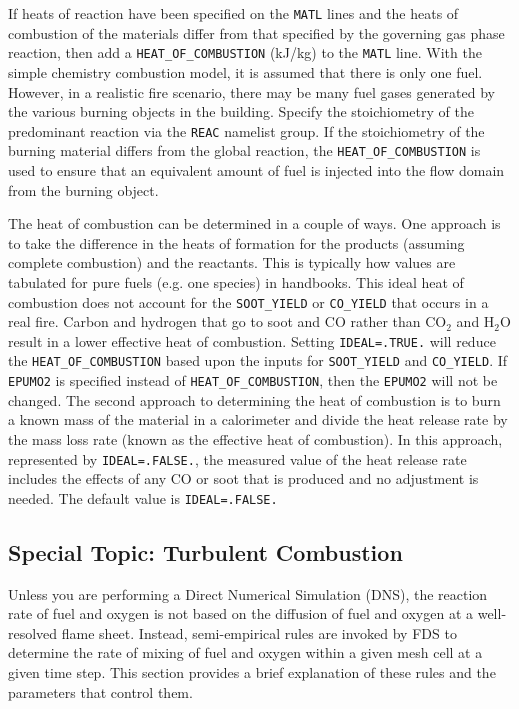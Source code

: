 \documentclass[11pt]{book}
\newcommand{\ct}{\tt\small}
\begin{document}
If heats of reaction have been specified on the
{\ct MATL} lines and
the heats of combustion of the materials differ from that specified by
the governing gas phase reaction, then add a
{\ct HEAT\_OF\_COMBUSTION} (kJ/kg) to the {\ct MATL} line.
With the simple chemistry combustion
model, it is assumed that there is only one fuel. However, in a realistic
fire scenario, there may be many fuel gases generated by the various
burning objects in the building. Specify
the stoichiometry of the predominant reaction via the {\ct REAC}
namelist group. If the stoichiometry of the burning material
differs from the global reaction, the {\ct HEAT\_OF\_COMBUSTION} is
used to ensure that an equivalent amount of fuel is injected into the
flow domain from the burning object.

The heat of combustion can be determined in a couple of ways.
One approach is to take the difference in the heats of formation for the products (assuming complete combustion) and the reactants.
This is typically how values are tabulated for pure fuels (e.g. one species) in handbooks.
This ideal heat of combustion does not account for the  {\ct SOOT\_YIELD} or  {\ct CO\_YIELD} that occurs in a real fire.
Carbon and hydrogen that go to soot and CO rather than CO$_2$ and H$_2$O result in a lower effective heat of combustion.
Setting {\ct IDEAL=.TRUE.} will reduce the {\ct HEAT\_OF\_COMBUSTION} based upon the inputs for {\ct SOOT\_YIELD} and {\ct CO\_YIELD}.
If {\ct EPUMO2} is specified instead of {\ct HEAT\_OF\_COMBUSTION}, then the {\ct EPUMO2} will not be changed.
The second approach to determining the heat of combustion is to burn a known mass of the material in a calorimeter and divide the heat release
rate by the mass loss rate (known as the effective heat of combustion).  In this approach, represented by {\ct IDEAL=.FALSE.},
the measured value of the heat release rate includes the effects of any CO or soot that is produced and no adjustment is needed.  The default value is {\ct IDEAL=.FALSE.}

\subsection{Special Topic: Turbulent Combustion}

\label{info:turbulent_combustion}

Unless you are performing a Direct Numerical Simulation (DNS), the reaction rate of fuel and oxygen is not based on the diffusion of
fuel and oxygen at a well-resolved flame sheet. Instead, semi-empirical rules are invoked by FDS to determine the rate of mixing of fuel and oxygen within
a given mesh cell at a given time step. This section provides a brief explanation of these rules and the parameters that control them.
\end{document}
